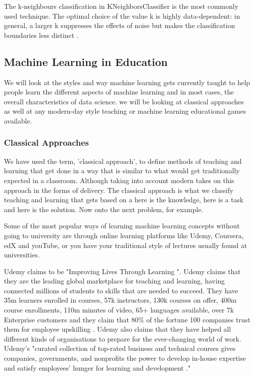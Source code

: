 		The k-neighbours classification in KNeighborsClassifier is the most commonly used technique. The optimal choice of the value k is highly data-dependent: in general, a larger k suppresses the effects of noise but makes the classification boundaries less distinct \cite{sklearn_knn}.
	
	\subsection{Machine Learning in Education}
		\label{seb_sec:ml_in_learning}
	
	We will look at the styles and way machine learning gets currently taught to help people learn the different aspects of machine learning and in most cases, the overall characteristics of data science. we will be looking at classical approaches as well at any modern-day style teaching or machine learning educational games available. 
	
	\subsubsection{Classical Approaches}
		\label{sub_sec:classical_teach_learn}
		
		We have used the term, 'classical approach', to define methods of teaching and learning that get done in a way that is similar to what would get traditionally expected in a classroom.  Although taking into account modern takes on this approach in the forms of delivery. The classical approach is what we classify teaching and learning that gets based on a here is the knowledge, here is a task and here is the solution. Now onto the next problem, for example.
		
		Some of the most popular ways of learning machine learning concepts without going to university are through online learning platforms like Udemy, Coursera, edX and youTube, or you have your traditional style of lectures usually found at universities.
		
		Udemy claims to be "Improving Lives Through Learning \cite{udemy}". Udemy claims that they are the leading global marketplace for teaching and learning, having connected millions of students to skills that are needed to succeed. They have 35m learners enrolled in courses, 57k instructors, 130k courses on offer, 400m course enrollments, 110m minutes of video, 65+ languages available, over 7k Enterprise customers and they claim that 80\% of the fortune 100 companies trust them for employee upskilling \cite{udemy}. Udemy also claims that they have helped all different kinds of organisations to prepare for the ever-changing world of work. Udemy's "curated collection of top-rated business and technical courses gives companies, governments, and nonprofits the power to develop in-house expertise and satisfy employees' hunger for learning and development \cite{udemy}." 
		
